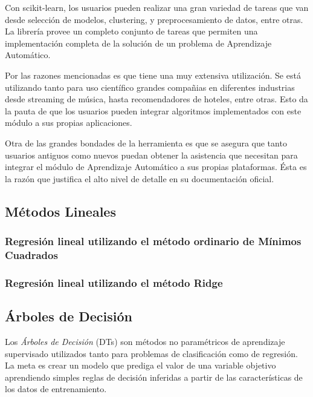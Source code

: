   \par Con scikit-learn, los usuarios pueden realizar una gran variedad de tareas
    que van desde selección de modelos, clustering, y preprocesamiento de datos, entre otras.
    La librería provee un completo conjunto de tareas que permiten una
    implementación completa de la solución de un problema de Aprendizaje Automático.

    Por las razones mencionadas es que tiene una muy extensiva utilización.
    Se está utilizando tanto para uso científico
    grandes compañias en diferentes industrias desde streaming de música, hasta
    recomendadores de hoteles, entre otras. Esto da la pauta de que los usuarios pueden
    integrar algoritmos implementados con este módulo a sus propias aplicaciones.

Otra de las grandes bondades de la herramienta es que se asegura que tanto usuarios
antiguos como nuevos puedan obtener la asistencia que necesitan para integrar
el módulo de Aprendizaje Automático a sus propias plataformas. Ésta es la razón
que justifica el alto nivel de detalle en su documentación oficial.



\subsection{Métodos Lineales}

\subsubsection{Regresión lineal utilizando el método ordinario de Mínimos Cuadrados}

\subsubsection{Regresión lineal utilizando el método Ridge}


\subsection{Árboles de Decisión}
  \par Los \textit{Árboles de Decisión} (DTs)\cite{decision_tree_regression}
    son métodos no paramétricos de aprendizaje supervisado
    utilizados tanto para problemas de clasificación como de regresión.
    La meta es crear un modelo que prediga el valor de una variable objetivo aprendiendo
    simples reglas de decisión inferidas a partir de las características de los datos
    de entrenamiento.


